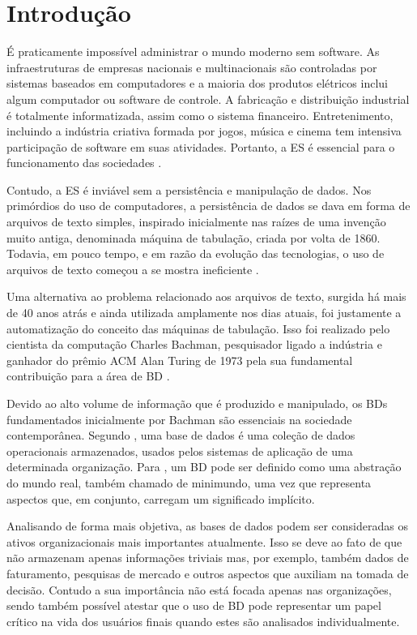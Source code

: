 \chapter{Introdução}\label{introducao}

É praticamente impossível administrar o mundo moderno sem software. 
As infraestruturas de empresas nacionais e multinacionais são controladas por sistemas baseados em computadores e a maioria dos produtos elétricos inclui algum computador ou software de controle. 
A fabricação e distribuição industrial é totalmente informatizada, assim como o sistema financeiro. 
Entretenimento, incluindo a indústria criativa formada por jogos, música e cinema tem intensiva participação de software em suas atividades. 
Portanto, a \ac{ES} é essencial para o funcionamento das sociedades \cite{Sommerville:2011}.

Contudo, a \ac{ES} é inviável sem a persistência e manipulação de dados. 
Nos primórdios do uso de computadores, a persistência de dados se dava em forma de arquivos de texto simples, inspirado inicialmente nas raízes de uma invenção muito antiga, denominada máquina de tabulação, criada por volta de 1860. 
Todavia, em pouco tempo, e em razão da evolução das tecnologias, o uso de arquivos de texto começou a se mostra ineficiente \cite{Silberschatz:1999}. 

Uma alternativa ao problema relacionado aos arquivos de texto, surgida há mais de 40 anos atrás e ainda utilizada amplamente nos dias atuais, foi justamente a automatização do conceito das máquinas de tabulação. 
Isso foi realizado pelo cientista da computação Charles Bachman, pesquisador ligado a indústria e ganhador do prêmio ACM Alan Turing de 1973 pela sua fundamental contribuição para a área de \ac{BD} \cite{Krishna:1992}.

Devido ao alto volume de informação que é produzido e manipulado, os \acp{BD} fundamentados inicialmente por Bachman são essenciais na sociedade contemporânea. 
Segundo , uma base de dados é uma coleção de dados operacionais armazenados, usados pelos sistemas de aplicação de uma determinada organização. 
Para , um \ac{BD} pode ser definido como uma abstração do mundo real, também chamado de minimundo, uma vez que representa aspectos que, em conjunto, carregam um significado implícito.

Analisando de forma mais objetiva, as bases de dados podem ser consideradas os ativos organizacionais mais importantes atualmente. 
Isso se deve ao fato de que não armazenam apenas informações triviais mas, por exemplo, também dados de faturamento, pesquisas de mercado e outros aspectos que auxiliam na tomada de decisão. 
Contudo a sua importância não está focada apenas nas organizações, sendo também possível atestar que o uso de \ac{BD} pode representar um papel crítico na vida dos usuários finais quando estes são analisados individualmente. 

